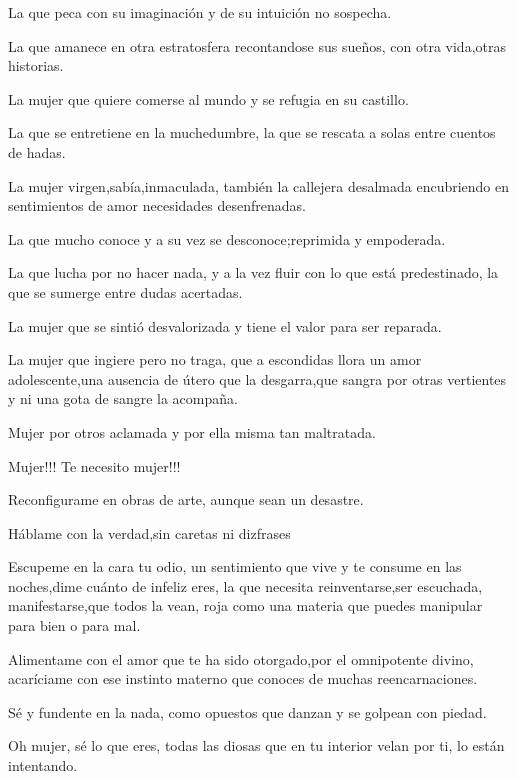 \documentclass[12pt, a4paper, twoside]{book} %
\begin{document}
La que peca con su imaginación y de su intuición no sospecha.

La que amanece en otra estratosfera recontandose sus sueños, con otra vida,otras historias.

La mujer que quiere comerse al mundo y se refugia en su castillo.

La que se entretiene en la muchedumbre, la que se rescata a solas entre cuentos de hadas.

La mujer virgen,sabía,inmaculada, también la callejera desalmada encubriendo en sentimientos de amor necesidades desenfrenadas.

La que mucho conoce y a su vez se desconoce;reprimida y empoderada.

La que lucha por no hacer nada, y a la vez fluir con lo que está predestinado, la que se sumerge entre dudas acertadas.

La mujer que se sintió desvalorizada y tiene el valor para ser reparada.

La mujer que ingiere pero no traga, que a escondidas llora un amor adolescente,una ausencia de útero que la desgarra,que sangra por otras vertientes y ni una gota de sangre la acompaña.

Mujer por otros aclamada y por ella misma tan maltratada.

Mujer!!! Te necesito mujer!!!

Reconfigurame en obras de arte, aunque sean un desastre.

Háblame con la verdad,sin caretas ni dizfrases

Escupeme en la cara tu odio, un sentimiento que vive y te consume en las noches,dime cuánto de infeliz eres, la que necesita reinventarse,ser escuchada, manifestarse,que todos la vean, roja como una materia que puedes manipular para bien o para mal.

Alimentame con el amor que te ha sido otorgado,por el omnipotente divino, acaríciame con ese instinto materno que conoces de muchas reencarnaciones.

Sé y fundente en la nada, como opuestos que danzan y se golpean con piedad.

Oh mujer, sé lo que eres, todas las diosas que en tu interior velan por ti, lo están intentando.
\end{document}
